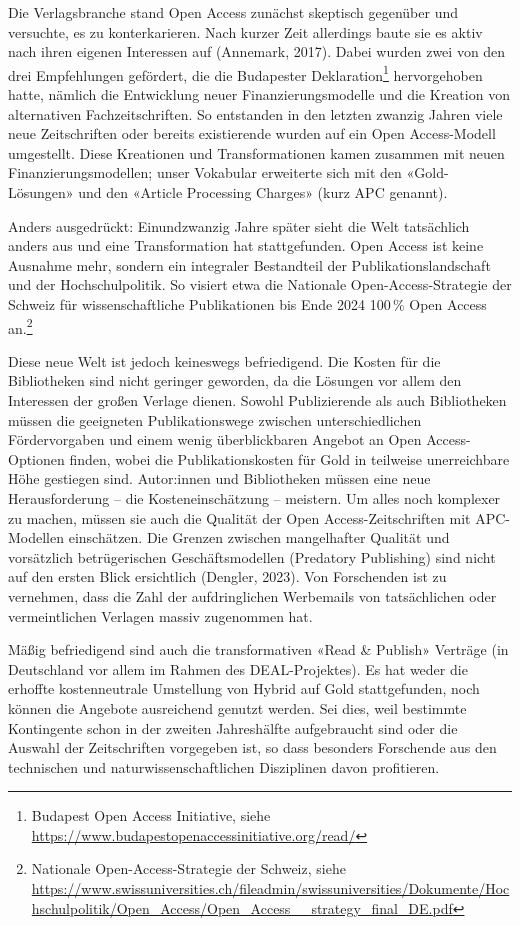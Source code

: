 \documentclass[a4paper,
fontsize=11pt,
oneside,
numbers=noperiodatend,
parskip=half-,
bibliography=totoc,
final
]{scrartcl}
\begin{document}
Die Verlagsbranche stand Open Access zunächst skeptisch gegenüber und
versuchte, es zu konterkarieren. Nach kurzer Zeit allerdings baute sie
es aktiv nach ihren eigenen Interessen auf (Annemark, 2017). Dabei
wurden zwei von den drei Empfehlungen gefördert, die die Budapester
Deklaration\footnote{Budapest Open Access Initiative, siehe
  \url{https://www.budapestopenaccessinitiative.org/read/}}
hervorgehoben hatte, nämlich die Entwicklung neuer Finanzierungsmodelle
und die Kreation von alternativen Fachzeitschriften. So entstanden in
den letzten zwanzig Jahren viele neue Zeitschriften oder bereits
existierende wurden auf ein Open Access-Modell umgestellt. Diese
Kreationen und Transformationen kamen zusammen mit neuen
Finanzierungsmodellen; unser Vokabular erweiterte sich mit den
«Gold-Lösungen» und den «Article Processing Charges» (kurz APC genannt).

Anders ausgedrückt: Einundzwanzig Jahre später sieht die Welt
tatsächlich anders aus und eine Transformation hat stattgefunden. Open
Access ist keine Ausnahme mehr, sondern ein integraler Bestandteil der
Publikationslandschaft und der Hochschulpolitik. So visiert etwa die
Nationale Open-Access-Strategie der Schweiz für wissenschaftliche
Publikationen bis Ende 2024 100\,\% Open Access an.\footnote{Nationale
  Open-Access-Strategie der Schweiz, siehe
  \url{https://www.swissuniversities.ch/fileadmin/swissuniversities/Dokumente/Hochschulpolitik/Open_Access/Open_Access__strategy_final_DE.pdf}}

Diese neue Welt ist jedoch keineswegs befriedigend. Die Kosten für die
Bibliotheken sind nicht geringer geworden, da die Lösungen vor allem den
Interessen der großen Verlage dienen. Sowohl Publizierende als auch
Bibliotheken müssen die geeigneten Publikationswege zwischen
unterschiedlichen Fördervorgaben und einem wenig überblickbaren Angebot
an Open Access-Optionen finden, wobei die Publikationskosten für Gold in
teilweise unerreichbare Höhe gestiegen sind. Autor:innen und
Bibliotheken müssen eine neue Herausforderung -- die Kosteneinschätzung
-- meistern. Um alles noch komplexer zu machen, müssen sie auch die
Qualität der Open Access-Zeitschriften mit APC-Modellen einschätzen. Die
Grenzen zwischen mangelhafter Qualität und vorsätzlich betrügerischen
Geschäftsmodellen (Predatory Publishing) sind nicht auf den ersten Blick
ersichtlich (Dengler, 2023). Von Forschenden ist zu vernehmen, dass die
Zahl der aufdringlichen Werbemails von tatsächlichen oder vermeintlichen
Verlagen massiv zugenommen hat.

Mäßig befriedigend sind auch die transformativen «Read \& Publish»
Verträge (in Deutschland vor allem im Rahmen des DEAL-Projektes). Es hat
weder die erhoffte kostenneutrale Umstellung von Hybrid auf Gold
stattgefunden, noch können die Angebote ausreichend genutzt werden. Sei
dies, weil bestimmte Kontingente schon in der zweiten Jahreshälfte
aufgebraucht sind oder die Auswahl der Zeitschriften vorgegeben ist, so
dass besonders Forschende aus den technischen und
naturwissenschaftlichen Disziplinen davon profitieren.
\end{document}
